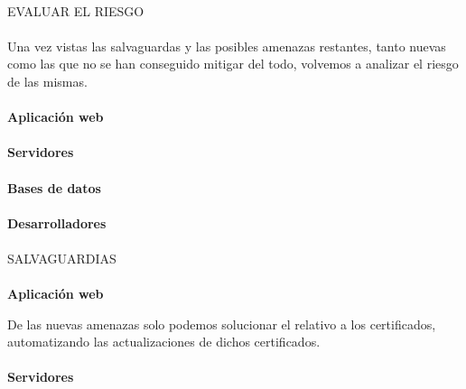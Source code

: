\paragraph{}
EVALUAR EL RIESGO
\paragraph{}
Una vez vistas las salvaguardas y las posibles amenazas restantes,
tanto nuevas como las que no se han conseguido mitigar del todo,
volvemos a analizar el riesgo de las mismas.


\paragraph{}
\textbf{Aplicación web}

\paragraph{}
\textbf{Servidores}

\paragraph{}
\textbf{Bases de datos}

\paragraph{}
\textbf{Desarrolladores}

\paragraph{}
SALVAGUARDIAS

\paragraph{}
\textbf{Aplicación web}

De las nuevas amenazas solo podemos solucionar el relativo a los
certificados, automatizando las actualizaciones de dichos
certificados.
\paragraph{}
\textbf{Servidores}

